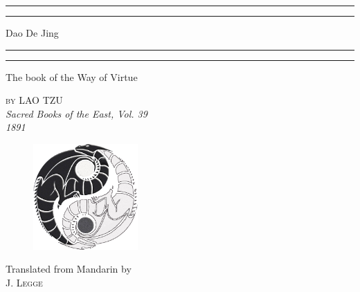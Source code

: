 \documentclass[a4paper, 11pt, oneside]{book} %
\newcommand\addEmptyPage{
        \null 
        \thispagestyle{empty}
        \addtocounter{page}{-1}
        \NoBgThispage
        \newpage
   }
\begin{document}
\begin{titlepage}
    \centering %
    \scshape %
    
    \vspace*{\baselineskip} %
    \rule{\textwidth}{1.6pt}\vspace*{-\baselineskip}\vspace*{2pt} %
    \rule{\textwidth}{0.4pt}%
    \vspace{1.25\baselineskip}
    
    {\LARGE Dao De Jing} %
    
    \vspace{0.75\baselineskip}
    \rule{\textwidth}{0.4pt}\vspace*{-\baselineskip}\vspace*{3.2pt}
    \rule{\textwidth}{1.6pt}
    
    \vspace{0.5\baselineskip} %
    
    The book of the Way of Virtue
   
    
   
   
   {\scshape\Large by LAO TZU\\}
   \vspace{1.5\baselineskip}
   \textit{Sacred Books of the East, Vol. 39\\1891}
   \vspace{6\baselineskip}
   \begin{figure}[h!]
       \centering
       \includegraphics[width=4cm]{Y&Y dragons.png}
       
       \label{fig:front_logo}
   \end{figure}
   \vfill
    Translated from Mandarin by\\{\scshape J. Legge\\}
   
    
\end{titlepage}
\addEmptyPage{}
\end{document}
